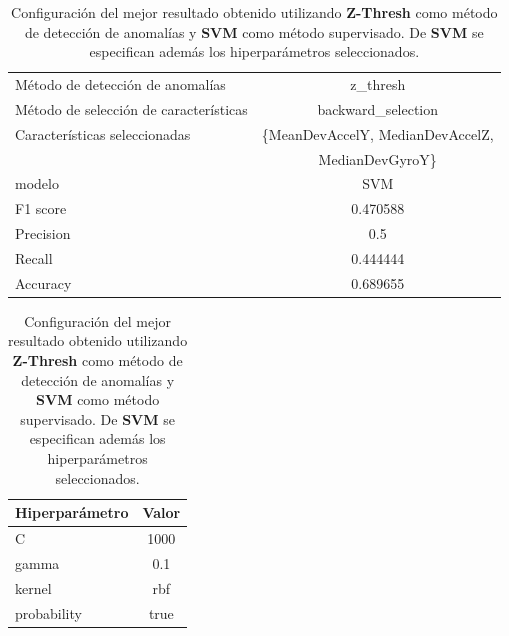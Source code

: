 \begin{appendices}
		\begin{table}[htb]
			\caption{Configuración del mejor resultado obtenido utilizando \textbf{Z-Thresh} como método de detección de anomalías y \textbf{SVM}
			como método supervisado. De \textbf{SVM} se especifican además los hiperparámetros seleccionados.}
			\label{table:25}
			\centering
			\begin{tabular}{lc}
				\toprule
					  Método de detección de anomalías &                                         z\_thresh \\
				Método de selección de características &                               backward\_selection  \\
						 Características seleccionadas & \{MeanDevAccelY, MedianDevAccelZ,  \\
						 							   &                                MedianDevGyroY\}  \\
												modelo &                                              SVM  \\
											  F1 score &                                         0.470588 \\
											 Precision &                                              0.5 \\
												Recall &                                         0.444444 \\
											  Accuracy &                                         0.689655 \\
				\bottomrule
			\end{tabular}
			\newline
			\newline

			\begin{tabular}{lc}
				\toprule
				Hiperparámetro & Valor \\
				\midrule
							 C &  1000 \\
						 gamma &   0.1 \\
						kernel &   rbf \\
				   probability &  true \\
				\bottomrule
			\end{tabular}
			
		\end{table}


\end{appendices}
